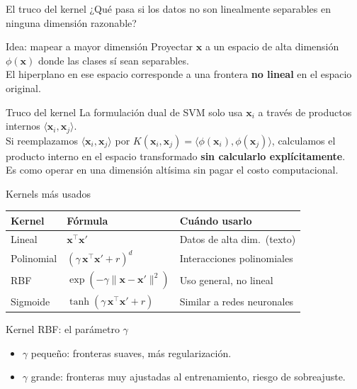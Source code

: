 \documentclass[aspectratio=169]{beamer}
\newcommand{\bx}{\bm{x}}
\begin{document}
\begin{frame}{El truco del kernel}
  ¿Qué pasa si los datos no son linealmente separables en ninguna dimensión razonable?

  \medskip
  \begin{block}{Idea: mapear a mayor dimensión}
    Proyectar $\bx$ a un espacio de alta dimensión $\phi(\bx)$ donde las clases sí sean separables.\\
    El hiperplano en ese espacio corresponde a una frontera \textbf{no lineal} en el espacio original.
  \end{block}

  \medskip
  \begin{exampleblock}{Truco del kernel}
    La formulación dual de SVM solo usa $\bx_i$ a través de productos internos $\langle \bx_i, \bx_j \rangle$.\\
    Si reemplazamos $\langle \bx_i, \bx_j \rangle$ por $K(\bx_i, \bx_j) = \langle \phi(\bx_i), \phi(\bx_j) \rangle$,
    calculamos el producto interno en el espacio transformado \textbf{sin calcularlo explícitamente}.\\[4pt]
    Es como operar en una dimensión altísima sin pagar el costo computacional.
  \end{exampleblock}
\end{frame}

\begin{frame}{Kernels más usados}
  \begin{center}
  \begin{tabular}{lll}
    \toprule
    \textbf{Kernel} & \textbf{Fórmula} & \textbf{Cuándo usarlo} \\
    \midrule
    Lineal     & $\bx^\top \bx'$                         & Datos de alta dim.\ (texto) \\
    Polinomial & $(\gamma\,\bx^\top\bx' + r)^d$          & Interacciones polinomiales \\
    RBF        & $\exp(-\gamma\|\bx-\bx'\|^2)$           & Uso general, no lineal \\
    Sigmoide   & $\tanh(\gamma\,\bx^\top\bx' + r)$       & Similar a redes neuronales \\
    \bottomrule
  \end{tabular}
  \end{center}

  \medskip
  \begin{block}{Kernel RBF: el parámetro $\gamma$}
    \begin{itemize}
      \item $\gamma$ pequeño: fronteras suaves, más regularización.
      \item $\gamma$ grande: fronteras muy ajustadas al entrenamiento, riesgo de sobreajuste.
    \end{itemize}
  \end{block}
\end{frame}
\end{document}

